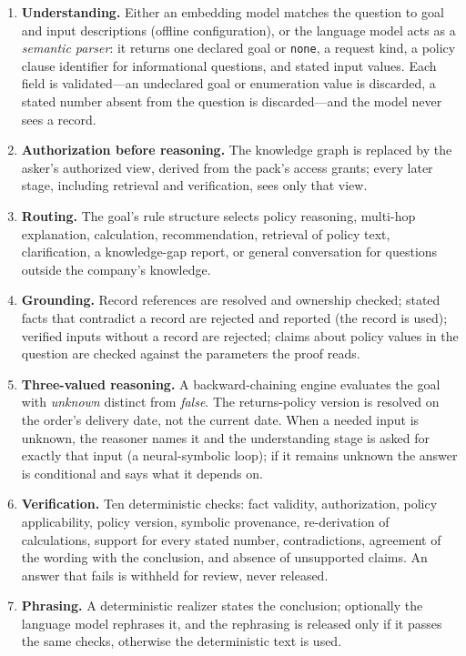 \documentclass[11pt]{article}
\begin{document}
\begin{enumerate}[leftmargin=*]
\item \textbf{Understanding.} Either an embedding model matches the question to goal and
input descriptions (offline configuration), or the language model acts as a
\emph{semantic parser}: it returns one declared goal or \texttt{none}, a request kind, a
policy clause identifier for informational questions, and stated input values. Each
field is validated---an undeclared goal or enumeration value is discarded, a stated
number absent from the question is discarded---and the model never sees a record.
\item \textbf{Authorization before reasoning.} The knowledge graph is replaced by the
asker's authorized view, derived from the pack's access grants; every later stage,
including retrieval and verification, sees only that view.
\item \textbf{Routing.} The goal's rule structure selects policy reasoning, multi-hop
explanation, calculation, recommendation, retrieval of policy text, clarification, a
knowledge-gap report, or general conversation for questions outside the company's
knowledge.
\item \textbf{Grounding.} Record references are resolved and ownership checked; stated
facts that contradict a record are rejected and reported (the record is used); verified
inputs without a record are rejected; claims about policy values in the question are
checked against the parameters the proof reads.
\item \textbf{Three-valued reasoning.} A backward-chaining engine evaluates the goal with
\emph{unknown} distinct from \emph{false}. The returns-policy version is resolved on the
order's delivery date, not the current date. When a needed input is unknown, the reasoner
names it and the understanding stage is asked for exactly that input (a
neural-symbolic loop); if it remains unknown the answer is conditional and says what it
depends on.
\item \textbf{Verification.} Ten deterministic checks: fact validity, authorization,
policy applicability, policy version, symbolic provenance, re-derivation of calculations,
support for every stated number, contradictions, agreement of the wording with the
conclusion, and absence of unsupported claims. An answer that fails is withheld for
review, never released.
\item \textbf{Phrasing.} A deterministic realizer states the conclusion; optionally the
language model rephrases it, and the rephrasing is released only if it passes the same
checks, otherwise the deterministic text is used.
\end{enumerate}
\end{document}

